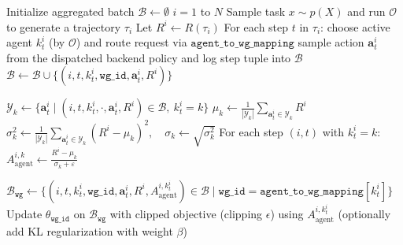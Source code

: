 \begin{algorithm}[H]
\begin{algorithmic}[1]
    \STATE \small{\color{gray}{// (B1) Distributed rollout collection: execute multi-agent orchestration at scale}}
    \STATE \small{}
    \STATE Initialize aggregated batch $\mathcal{B}\leftarrow \emptyset$
     $i=1$ to $N$
        \STATE \hspace{1em} Sample task $x\sim p(X)$ and run $\mathcal{O}$ to generate a trajectory $\tau_i$
        \STATE \hspace{1em} Let $R^i \leftarrow R(\tau_i)$ \small{\color{gray}{// trajectory-level reward shared by all steps}}
        \STATE \hspace{1em} For each step $t$ in $\tau_i$:
        \STATE \hspace{2em} choose active agent $k_t^i$ (by $\mathcal{O}$) and route request via $\texttt{agent\_to\_wg\_mapping}$
        \STATE \hspace{2em} sample action $\bm{a}_t^{i}$ from the dispatched backend policy and log step tuple into $\mathcal{B}$
        \STATE \hspace{2em} $\mathcal{B}\leftarrow \mathcal{B}\cup\{(i,t,k_t^i,\texttt{wg\_id},\bm{a}_t^{i},R^i)\}$

    \STATE \small{}
        \STATE $\mathcal{Y}_k \leftarrow \{\bm{a}_t^i \mid (i,t,k_t^i,\cdot,\bm{a}_t^{i},R^i)\in\mathcal{B},\ k_t^i=k\}$
        \STATE $\mu_k \leftarrow \frac{1}{|\mathcal{Y}_k|}\sum_{\bm{a}_t^i\in \mathcal{Y}_k} R^i$
        \STATE $\sigma_k^2 \leftarrow \frac{1}{|\mathcal{Y}_k|}\sum_{\bm{a}_t^i\in \mathcal{Y}_k}(R^i-\mu_k)^2,\quad \sigma_k\leftarrow\sqrt{\sigma_k^2}$
        \STATE For each step $(i,t)$ with $k_t^i=k$:  $A^{i,k}_{\mathrm{agent}}\leftarrow \frac{R^i-\mu_k}{\sigma_k+\varepsilon}$
    \ENDFOR

    \STATE \small{}
    \STATE \small{}
        \STATE $\mathcal{B}_{\texttt{wg}} \leftarrow \{(i,t,k_t^i,\texttt{wg\_id},\bm{a}_t^{i},R^i,A^{i,k_t^i}_{\mathrm{agent}})\in\mathcal{B}\mid \texttt{wg\_id}=\texttt{agent\_to\_wg\_mapping}[k_t^i]\}$
        \STATE Update $\theta_{\texttt{wg\_id}}$ on $\mathcal{B}_{\texttt{wg}}$ with clipped objective (clipping $\epsilon$) using $A^{i,k_t^i}_{\mathrm{agent}}$ (optionally add KL regularization with weight $\beta$)
    \ENDFOR
\ENDFOR
\end{algorithmic}
\end{algorithm}


